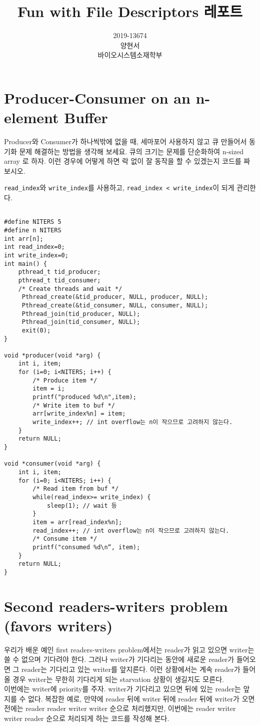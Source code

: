 \documentclass{article}
\title{Fun with File Descriptors 레포트}
\date{}
\author{
  2019-13674\\
  양현서 \\
  바이오시스템소재학부\\
}
\begin{document}
\maketitle
\section{Producer-Consumer on an n-element Buffer}
Producer와 Consumer가 하나씩밖에 없을 때, 세마포어 사용하지 않고 큐 만들어서 동기화 문제 해결하는 방법을 생각해 보세요. 큐의 크기는 문제를 단순화하여 n-sized array 로 하자. 이런 경우에 어떻게 하면 락 없이 잘 동작을 할 수 있겠는지 코드를 짜 보시오.

\lstinline{read_index}와 \lstinline{write_index}를 사용하고, \lstinline{read_index < write_index}이 되게 관리한다.
\begin{verbatim}

#define NITERS 5
#define n NITERS
int arr[n];
int read_index=0;
int write_index=0;
int main() {
    pthread_t tid_producer;
    pthread_t tid_consumer;
    /* Create threads and wait */
     Pthread_create(&tid_producer, NULL, producer, NULL);
     Pthread_create(&tid_consumer, NULL, consumer, NULL);
     Pthread_join(tid_producer, NULL);
     Pthread_join(tid_consumer, NULL);
     exit(0);
}

void *producer(void *arg) {
    int i, item;
    for (i=0; i<NITERS; i++) {
        /* Produce item */
        item = i;
        printf("produced %d\n",item);
        /* Write item to buf */
        arr[write_index%n] = item;
        write_index++; // int overflow는 n이 작으므로 고려하지 않는다.
    }
    return NULL;
}

void *consumer(void *arg) {
    int i, item;
    for (i=0; i<NITERS; i++) {
        /* Read item from buf */
        while(read_index>= write_index) {
            sleep(1); // wait 등
        }
        item = arr[read_index%n];
        read_index++; // int overflow는 n이 작으므로 고려하지 않는다.
        /* Consume item */
        printf("consumed %d\n“, item);
    }
    return NULL;
}
\end{verbatim}

\section{Second readers-writers problem (favors writers)}
우리가 배운 예인 first readers-writers problem에서는 reader가 읽고 있으면 writer는 쓸 수 없으며 기다려야 한다. 그러나 writer가 기다리는 동안에 새로운 reader가 들어오면 그 reader는 기다리고 있는 writer를 앞지른다. 이런 상황에서는 계속 reader가 들어올 경우 writer는 무한히 기다리게 되는 starvation 상황이 생길지도 모른다.
\\
이번에는 writer에 priority를 주자. writer가 기다리고 있으면 뒤에 있는 reader는 앞지를 수 없다. 복잡한 예로, 만약에 reader 뒤에 writer 뒤에 reader 뒤에 writer가 오면 전에는 reader reader writer writer 순으로 처리했지만, 이번에는 reader writer writer reader 순으로 처리되게 하는 코드를 작성해 본다.
\end{document}
